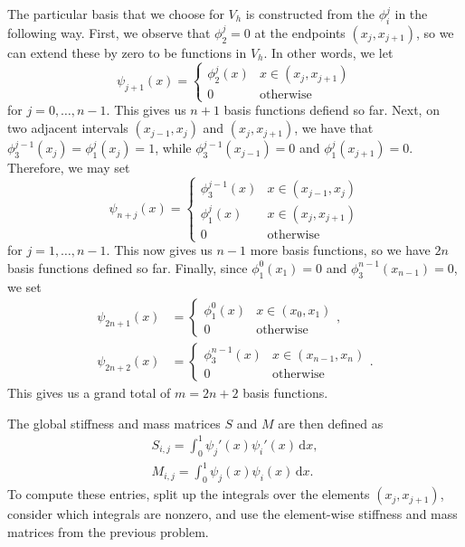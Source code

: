 \documentclass{article}
\theoremstyle{definition}
\theoremstyle{plain}
\renewcommand{\d}{\mathrm d}
\begin{document}
The particular basis that we choose for $V_h$ is constructed from the $\phi_i^j$ in the following way.
First, we observe that $\phi_2^j = 0$ at the endpoints $(x_j,x_{j+1})$, so we can extend these by zero to be functions in $V_h$.
In other words, we let
\begin{equation}
  \psi_{j+1}(x) = \begin{cases} \phi_2^j(x) & x \in (x_j,x_{j+1}) \\ 0 & \text{otherwise} \end{cases}
\end{equation}
for $j = 0,\dots,n-1$.
This gives us $n + 1$ basis functions defiend so far.
Next, on two adjacent intervals $(x_{j-1},x_j)$ and $(x_j,x_{j+1})$, we have that $\phi_3^{j-1}(x_j) = \phi_1^j(x_j) = 1$, while $\phi_3^{j-1}(x_{j-1}) = 0$ and $\phi_1^j(x_{j+1}) = 0$.
Therefore, we may set 
\begin{equation}
  \psi_{n+j}(x) = \begin{cases} \phi_3^{j-1}(x) & x \in (x_{j-1},x_j) \\ \phi_1^j(x) & x \in (x_j,x_{j+1}) \\  0 & \text{otherwise} \end{cases}
\end{equation}
for $j = 1,\dots,n-1$.
This now gives us $n-1$ more basis functions, so we have $2n$ basis functions defined so far.
Finally, since $\phi_1^0(x_1) = 0$ and $\phi_3^{n-1}(x_{n-1}) = 0$, we set 
\begin{align}
  \psi_{2n+1}(x) & = \begin{cases} \phi_1^{0}(x) & x \in (x_0,x_1) \\  0 & \text{otherwise} \end{cases}, \\
  \psi_{2n+2}(x) & = \begin{cases} \phi_3^{n-1}(x) & x \in (x_{n-1},x_n) \\  0 & \text{otherwise} \end{cases}.
\end{align}
This gives us a grand total of $m = 2n+2$ basis functions.

The global stiffness and mass matrices $S$ and $M$ are then defined as 
\begin{align}
  S_{i,j} = \int_0^1\psi_j'(x)\psi_i'(x)\,\d x, \\
  M_{i,j} = \int_0^1\psi_j(x)\psi_i(x)\,\d x.
\end{align}
To compute these entries, split up the integrals over the elements $(x_j,x_{j+1})$, consider which integrals are nonzero, and use the element-wise stiffness and mass matrices from the previous problem.
\end{document}
